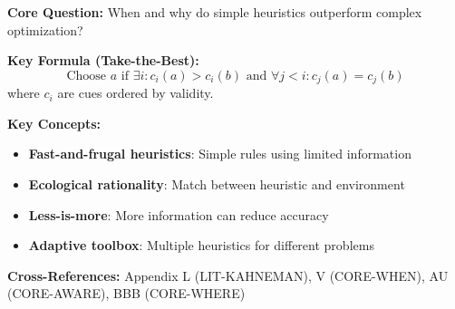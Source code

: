 \begin{tcolorbox}[colback=blue!5!white, colframe=blue!75!black,
    title=Quick Reference: LIT-GIGERENZER]

\textbf{Core Question:} When and why do simple heuristics outperform complex optimization?

\textbf{Key Formula (Take-the-Best):}
\begin{equation}
\text{Choose } a \text{ if } \exists i: c_i(a) > c_i(b) \text{ and } \forall j < i: c_j(a) = c_j(b)
\end{equation}
where $c_i$ are cues ordered by validity.

\textbf{Key Concepts:}
\begin{itemize}[nosep]
\item \textbf{Fast-and-frugal heuristics}: Simple rules using limited information
\item \textbf{Ecological rationality}: Match between heuristic and environment
\item \textbf{Less-is-more}: More information can reduce accuracy
\item \textbf{Adaptive toolbox}: Multiple heuristics for different problems
\end{itemize}

\textbf{Cross-References:} Appendix L (LIT-KAHNEMAN), V (CORE-WHEN), AU (CORE-AWARE), BBB (CORE-WHERE)
\end{tcolorbox}


